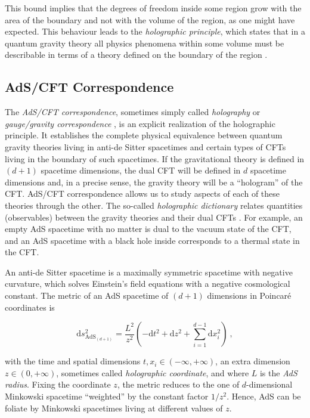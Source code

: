 \documentclass[twocolumn]{revtex4}
\providecommand{\eq}[2]{
    \begin{equation}
        #2
    \label{eq:#1}
    \end{equation}
}
\begin{document}
This bound implies that the degrees of freedom inside some region grow with the area of the boundary and not with the volume of the region, as one might have expected. This behaviour leads to the \emph{holographic principle}, which states that in a quantum gravity theory all physics phenomena within some volume must be describable in terms of a theory defined on the boundary of the region \cite{t_hooft_dimensional_2009}.


\subsection{AdS/CFT Correspondence} \label{ss:AdS/CFT}

The \emph{AdS/CFT correspondence}, sometimes simply called \emph{holography} or \emph{gauge/gravity correspondence} \cite{maldacena_large_1999}, is an explicit realization of the holographic principle. It establishes the complete physical equivalence between quantum gravity theories living in anti-de Sitter spacetimes and certain types of CFTs living in the boundary of such spacetimes. If the gravitational theory is defined in $(d+1)$ spacetime dimensions, the dual CFT will be defined in $d$ spacetime dimensions and, in a precise sense, the gravity theory will be a ``hologram'' of the CFT. AdS/CFT correspondence allows us to study aspects of each of these theories through the other. The so-called \emph{holographic dictionary} relates quantities (observables) between the gravity theories and their dual CFTs \cite{witten_anti_1998, gubser_gauge_1998}. For example, an empty AdS spacetime with no matter is dual to the vacuum state of the CFT, and an AdS spacetime with a black hole inside corresponds to a thermal state in the CFT.

An anti-de Sitter spacetime is a maximally symmetric spacetime with negative curvature, which solves Einstein's field equations with a negative cosmological constant. The metric of an AdS spacetime of $(d+1)$ dimensions in Poincar\'e coordinates is \cite{kaplan_lectures_nodate}
\eq{AdS_PP-metric}{
    \mathrm{d} s_{\text{AdS}_{(d+1)}}^2 = \frac{L^2}{z^2} \left( -\mathrm{d} t^2 + \mathrm{d} z^2 + \sum_{i=1}^{d-1} \mathrm{d} x_i^2 \right) \ ,
}
with the time and spatial dimensions $t , x_i \in (-\infty,+\infty)$, an extra dimension $z \in (0,+\infty)$, sometimes called \emph{holographic coordinate}, and where $L$ is the \emph{AdS radius}. Fixing the coordinate $z$, the metric reduces to the one of $d$-dimensional Minkowski spacetime ``weighted'' by the constant factor $1/z^2$. Hence, AdS can be foliate by Minkowski spacetimes living at different values of $z$.
\end{document}
